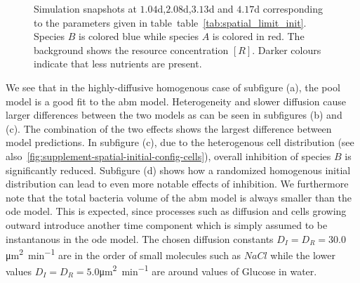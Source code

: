 \documentclass[10pt,A4paper]{article}
\numberwithin{equation}{section}
\begin{document}
\begin{figure}
    \caption{
        Simulation snapshots at $1.04$\unit{\day},$2.08$\unit{\day},$3.13$\unit{\day} and $4.17$\unit{\day} corresponding to the parameters given in table~table~\ref{tab:spatial_limit_init}.
        Species $B$ is colored blue while species $A$ is colored in red.
        The background shows the resource concentration $[R]$.
        Darker colours indicate that less nutrients are present.
    }
    \label{fig:spatial-snapshots}
\end{figure}
%
%
We see that in the highly-diffusive homogenous case of subfigure (a), the pool model is a good fit to the \ac{abm} model.
Heterogeneity and slower diffusion cause larger differences between the two models as can be seen in subfigures (b) and (c).
The combination of the two effects shows the largest difference between model predictions.
In subfigure (c), due to the heterogenous cell distribution (see also~\ref{fig:supplement-spatial-initial-config-cells}), overall inhibition of species $B$ is significantly reduced.
Subfigure (d) shows how a randomized homogenous initial distribution can lead to even more notable effects of inhibition.
We furthermore note that the total bacteria volume of the \ac{abm} model is always smaller than the \ac{ode} model.
This is expected, since processes such as diffusion and cells growing outward introduce another time component which is simply assumed to be instantanous in the \ac{ode} model.
The chosen diffusion constants $D_I=D_R=30.0$\unit{\micro\metre\squared\per\minute} are in the order of small molecules such as $NaCl$ while the lower values $D_I=D_R=5.0$\unit{\micro\metre\squared\per\minute} are around values of Glucose in water.
\end{document}
